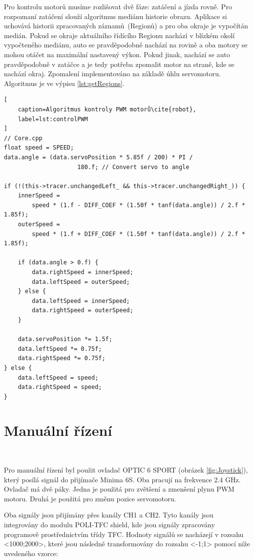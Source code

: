 Pro kontrolu motorů musíme rozlišovat dvě fáze: zatáčení a jízda rovně.
Pro rozpoznaní zatáčení slouží algoritmus mediánu historie obrazu.
Aplikace si uchovává historii zpracovaných záznamů~(Regionů) a pro oba
okraje je vypočítán medián. Pokud se okraje aktuálního řídícího Regionu nachází
v blízkém okolí vypočteného mediánu, auto se pravděpodobně
nachází na rovině a oba motory se mohou otáčet na maximální nastavený výkon.
Pokud jinak, nachází se auto pravděpodobně v zatáčce a je tedy potřeba zpomalit
motor na straně, kde se nachází okraj.
Zpomalení implementováno na základě úhlu servomotoru.
Algoritmus je ve výpisu \ref{lst:getRegions}\cite{robot}.
\begin{lstlisting}[
	caption=Algoritmus kontroly PWM motorů\cite{robot},
	label=lst:controlPWM
]
// Core.cpp
float speed = SPEED;
data.angle = (data.servoPosition * 5.85f / 200) * PI /
	                 180.f; // Convert servo to angle

if (!(this->tracer.unchangedLeft_ && this->tracer.unchangedRight_)) {
    innerSpeed =
        speed * (1.f - DIFF_COEF * (1.50f * tanf(data.angle)) / 2.f * 1.85f);
    outerSpeed =
        speed * (1.f + DIFF_COEF * (1.50f * tanf(data.angle)) / 2.f * 1.85f);

    if (data.angle > 0.f) {
        data.rightSpeed = innerSpeed;
        data.leftSpeed = outerSpeed;
    } else {
        data.leftSpeed = innerSpeed;
        data.rightSpeed = outerSpeed;
    }

    data.servoPosition *= 1.5f;
    data.leftSpeed *= 0.75f;
    data.rightSpeed *= 0.75f;
} else {
    data.leftSpeed = speed;
    data.rightSpeed = speed;
}
\end{lstlisting}

\section{Manuální řízení}\

Pro manuální řízení byl použit ovladač OPTIC 6 SPORT (obrázek \ref{fig:Joystick}),
který posílá signál do přijímače Minima 6S.
Oba pracují na frekvence 2.4 GHz. Ovladač má
dvě páky. Jedna je použitá pro zvětšení a zmenšení plynu PWM motoru.
Druhá je použitá pro změnu pozice servomotoru\cite{RC}.

Oba signály jsou přijímány přes kanály CH1 a CH2\cite{RC}.
Tyto kanály jsou integrovány do modulu POLI-TFC shield,
kde jsou signály zpracovány programově prostřednictvím třídy TFC\cite{draha}.
Hodnoty signálů se nacházejí v rozsahu <1000;2000>, které jsou následně
transformovány do rozsahu <-1;1> pomocí níže uvedeného vzorce:

